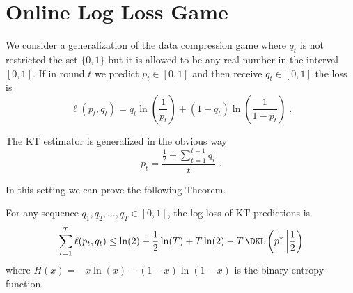 \section{Online Log Loss Game}
\label{section:log-loss}

We consider a generalization of the data compression game where $q_t$ is not
restricted the set $\{0,1\}$ but it is allowed to be any real number in the
interval $[0,1]$. If in round $t$ we predict $p_t \in [0,1]$ and then receive
$q_t \in [0,1]$ the loss is
$$
\ell(p_t, q_t) = q_t \ln\left( \frac{1}{p_t}\right) + (1-q_t) \ln  \left( \frac{1}{1 - p_t} \right) \; .
$$

The KT estimator is generalized in the obvious way
$$
p_t = \frac{\frac{1}{2} + \sum_{t=1}^{t-1} q_i}{t}\; .
$$


In this setting we can prove the following Theorem.
\begin{theorem}
\label{theo:logloss}
For any sequence $q_1, q_2, \dots, q_T \in [0,1]$, the log-loss of KT
predictions is
$$
\sum_{t=1}^T \ell(p_t, q_t) \leq \ln(2) + \frac{1}{2} \ln(T) + T \ln (2) -T \, \DKL\left(p^*\middle\|\frac{1}{2}\right)
$$
where $H(x) = - x \ln(x) - (1-x) \ln (1-x)$ is the binary entropy function.
\end{theorem}